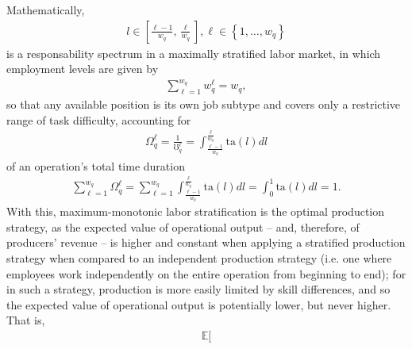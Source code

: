 \documentclass[hidelinks, nonatbib]{elsarticle}
\begin{document}
\begin{enumerate}
\begin{enumerate}
\begin{enumerate}
            Mathematically,
            \begin{gather}
                l \in \left[
                \frac{\ell - 1}{w_q}
                ,
                \frac{\ell}{w_q}
                \right]
                ,
                \ell \in 
                \left\{
                    1, \dots, w_q
                \right\}
            \end{gather}
            is a responsability spectrum in a maximally stratified labor market, in which employment levels are given by
            \begin{gather}
                \sum_{\ell=1}^{w_q}
                w_{q}^{\ell}
                =
                w_q
                ,
            \end{gather}
            so that any available position is its own job subtype and covers only a restrictive range of task difficulty, accounting for
            \begin{gather}
                \Omega_{q}^{\ell} = 
                \frac{1}{\mho_{q}^{\ell}} = 
                \int_{
                    \frac{\ell - 1}{w_q}
                }^{
                    \frac{\ell}{w_q}
                }
                \text{ta}(l)dl
            \end{gather}
            of an operation's total time duration
            \begin{gather}
                \sum_{\ell=1}^{w_q}
                \Omega_{q}^{\ell} 
                = 
                \sum_{\ell=1}^{w_q}
                \int_{
                    \frac{\ell - 1}{w_q}
                }^{
                    \frac{\ell}{w_q}
                }
                \text{ta}(l)dl
                =
                \int_{0}^{1}
                \text{ta}(l)dl
                =
                1
                .
            \end{gather}
            With this, maximum-monotonic labor stratification is the optimal production strategy, as the expected value of operational output -- and, therefore, of producers' revenue -- is higher and constant when applying a stratified production strategy when compared to an independent production strategy (i.e. one where employees work independently on the entire operation from beginning to end); for in such a strategy, production is more easily limited by skill differences, and so the expected value of operational output is potentially lower, but never higher. That is, 
            \begin{gather}
                \mathbb{E}[

\end{gather}
\end{enumerate}
\end{enumerate}
\end{enumerate}
\end{document}
